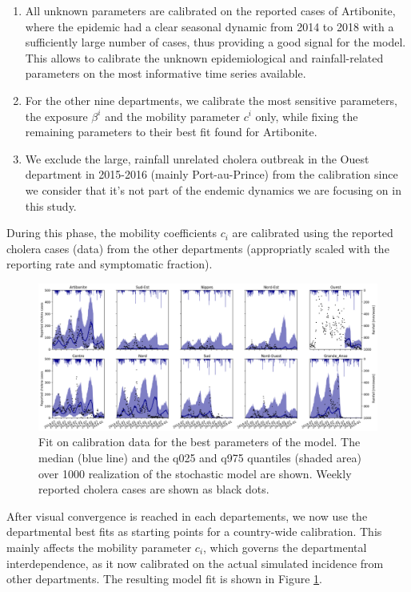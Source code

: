 \begin{enumerate}
    \item All unknown parameters are calibrated on the reported cases of Artibonite, where the epidemic had a clear seasonal dynamic from 2014 to 2018 with a sufficiently large number of cases, thus providing a good signal for the model.  This allows to calibrate the unknown epidemiological and rainfall-related parameters on the most informative time series available.
    \item For the other nine departments, we calibrate the most sensitive parameters, the exposure $\beta^i$ and the mobility parameter $c^i$ only, while fixing the remaining parameters to their best fit found for Artibonite.
    \item We exclude the large, rainfall unrelated cholera outbreak in the Ouest department in 2015-2016 (mainly Port-au-Prince)\cite{Rebaudet:NationalAlertresponseStrategy:2018} from the calibration since we consider that it's not part of the endemic dynamics we are focusing on in this study.
\end{enumerate}

During this phase, the mobility coefficients $c_i$ are calibrated using the reported cholera cases (data) from the other departments (appropriatly scaled with the reporting rate and symptomatic fraction).
\begin{figure}[htbp]
\begin{center}
\includegraphics[width=1.0\textwidth]{fig_cholera-haiti-ocv/fit.png}
\caption[Fit on calibration data for the best parameter of the model]{Fit on calibration data for the best parameters of the model. The median (blue line) and the q025 and q975 quantiles (shaded area) over 1000 realization of the stochastic model are shown. Weekly reported cholera cases are shown as black dots.}
\label{fitEPFL}
\end{center}
\end{figure}
After visual convergence is reached in each departements, we now use the departmental best fits as starting points for a country-wide calibration. This mainly affects the mobility parameter $c_i$, which governs the departmental interdependence, as it now calibrated on the actual simulated incidence from other departments. The resulting model fit is shown in Figure \ref{fitEPFL}. 

